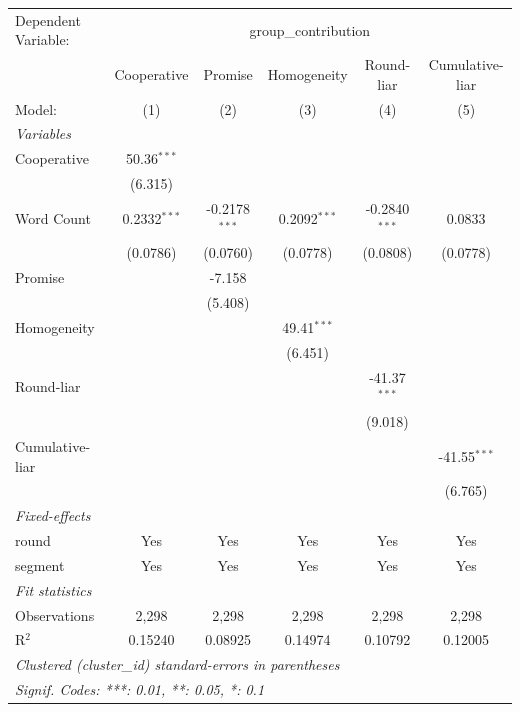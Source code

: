 
\begingroup
\centering
\begin{tabular}{lccccc}
   \tabularnewline \midrule \midrule
   Dependent Variable: & \multicolumn{5}{c}{group\_contribution}\\
                   & Cooperative    & Promise         & Homogeneity    & Round-liar      & Cumulative-liar \\   
   Model:          & (1)            & (2)             & (3)            & (4)             & (5)\\  
   \midrule
   \emph{Variables}\\
   Cooperative     & 50.36$^{***}$  &                 &                &                 &   \\   
                   & (6.315)        &                 &                &                 &   \\   
   Word Count      & 0.2332$^{***}$ & -0.2178$^{***}$ & 0.2092$^{***}$ & -0.2840$^{***}$ & 0.0833\\   
                   & (0.0786)       & (0.0760)        & (0.0778)       & (0.0808)        & (0.0778)\\   
   Promise         &                & -7.158          &                &                 &   \\   
                   &                & (5.408)         &                &                 &   \\   
   Homogeneity     &                &                 & 49.41$^{***}$  &                 &   \\   
                   &                &                 & (6.451)        &                 &   \\   
   Round-liar      &                &                 &                & -41.37$^{***}$  &   \\   
                   &                &                 &                & (9.018)         &   \\   
   Cumulative-liar &                &                 &                &                 & -41.55$^{***}$\\   
                   &                &                 &                &                 & (6.765)\\   
   \midrule
   \emph{Fixed-effects}\\
   round           & Yes            & Yes             & Yes            & Yes             & Yes\\  
   segment         & Yes            & Yes             & Yes            & Yes             & Yes\\  
   \midrule
   \emph{Fit statistics}\\
   Observations    & 2,298          & 2,298           & 2,298          & 2,298           & 2,298\\  
   R$^2$           & 0.15240        & 0.08925         & 0.14974        & 0.10792         & 0.12005\\  
   \midrule \midrule
   \multicolumn{6}{l}{\emph{Clustered (cluster\_id) standard-errors in parentheses}}\\
   \multicolumn{6}{l}{\emph{Signif. Codes: ***: 0.01, **: 0.05, *: 0.1}}\\
\end{tabular}
\par\endgroup


